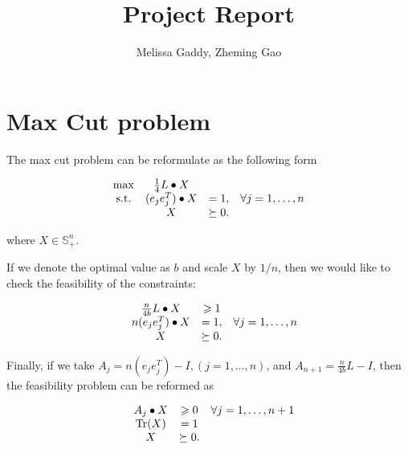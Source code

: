 \documentclass[12pt]{article}
\begin{document}
 
 
\title{Project Report}
\author{Melissa Gaddy, Zheming Gao}
\maketitle

\section{Max Cut problem}

The max cut problem can be reformulate as the following form

\begin{equation}\label{Originalproblem}
\begin{array}{c c c c}
\max & \frac{1}{4} L \bullet X &  & \\
\text{s.t.} & (e_je_j^T) \bullet X  & =  1,  & \forall j = 1,\dots, n \\ 
 & X  & \succeq  0. &
\end{array}
\end{equation}

where $X\in \mathbb S_+^n$.

If we denote the optimal value as $b$ and scale $X$ by $1/n$, then we would like to check the feasibility of the constraints:


\begin{equation*}
\begin{array}{c c c c}
& \frac{n}{4b} L \bullet X & \geqslant 1 & \\
& n(e_je_j^T) \bullet X  & =  1,  & \forall j = 1,\dots, n \\ 
 & X  & \succeq  0. &
\end{array}
\end{equation*}

Finally, if we take $A_j = n(e_je_j^T) - I, (j = 1,\dots, n)$, and $A_{n+1} = \frac{n}{4b} L - I$, then the feasibility problem can be reformed as 

\begin{equation}\label{feasiblilityproblem}
\begin{array}{c c c c}
& A_j \bullet X & \geqslant 0 & \forall j = 1,\dots, n+1 \\
& \text{Tr}(X) & = 1 &\\ 
 & X  & \succeq  0. &
\end{array}
\end{equation}
\end{document}

